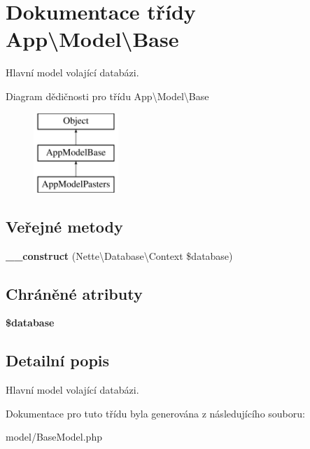 \hypertarget{classApp_1_1Model_1_1Base}{\section{Dokumentace třídy App\textbackslash{}Model\textbackslash{}Base}
\label{classApp_1_1Model_1_1Base}
}


Hlavní model volající databázi.  


Diagram dědičnosti pro třídu App\textbackslash{}Model\textbackslash{}Base\begin{figure}[H]
\begin{center}
\leavevmode
\includegraphics[height=3.000000cm]{classApp_1_1Model_1_1Base}
\end{center}
\end{figure}
\subsection*{Veřejné metody}
\begin{DoxyCompactItemize}
\item 
\hypertarget{classApp_1_1Model_1_1Base_a9cdb951ad2ab48fb8661f8db19527596}{{\bfseries \-\_\-\-\_\-construct} (Nette\textbackslash{}\-Database\textbackslash{}\-Context \$database)}\label{classApp_1_1Model_1_1Base_a9cdb951ad2ab48fb8661f8db19527596}

\end{DoxyCompactItemize}
\subsection*{Chráněné atributy}
\begin{DoxyCompactItemize}
\item 
\hypertarget{classApp_1_1Model_1_1Base_af3c545dcc02fdfc450ec0a20a24148d5}{{\bfseries \$database}}\label{classApp_1_1Model_1_1Base_af3c545dcc02fdfc450ec0a20a24148d5}

\end{DoxyCompactItemize}


\subsection{Detailní popis}
Hlavní model volající databázi. 

Dokumentace pro tuto třídu byla generována z následujícího souboru\-:\begin{DoxyCompactItemize}
\item 
model/Base\-Model.\-php\end{DoxyCompactItemize}
